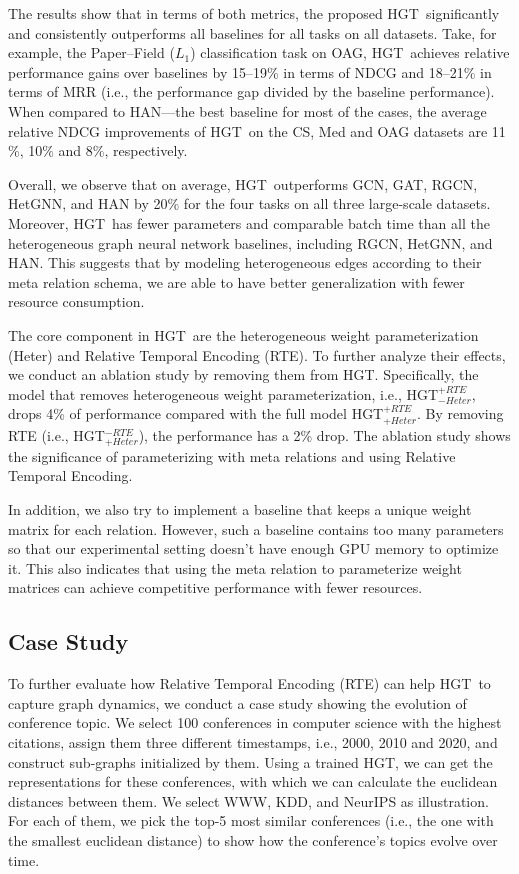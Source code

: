 \documentclass[sigconf]{acmart}
\theoremstyle{definition}
\newcommand{\short}{HGT}
\begin{document}
The results show that in terms of both metrics, the proposed \short\ significantly and consistently outperforms all baselines for all tasks on all datasets. 
Take, for example, the Paper--Field ($L_1$) classification task on OAG, \short\ achieves relative performance gains over baselines by 15--19\% in terms of NDCG and 18--21\% in terms of MRR (i.e., the performance gap divided by the baseline performance). 
When compared to HAN---the best baseline for most of the cases, the average relative NDCG improvements of \short\ on the CS, Med and OAG datasets are 11$\%$, 10$\%$ and 8$\%$, respectively. 

Overall, we observe that on average, \short\ outperforms GCN, GAT, RGCN, HetGNN, and HAN by 20\% for the four tasks on all three large-scale datasets.  
Moreover, \short\ has fewer parameters and comparable batch time than all the heterogeneous graph neural network baselines, including RGCN, HetGNN, and HAN. 
This suggests that by modeling heterogeneous edges according to their meta relation schema, we are able to have better generalization with fewer resource consumption. 



The core component in \short\ are the heterogeneous weight parameterization (Heter) and Relative Temporal Encoding (RTE).
To further analyze their effects, we conduct an ablation study by removing them from \short. 
Specifically, the model that removes heterogeneous weight parameterization, i.e., \short$_{-Heter}^{+RTE}$, drops 4\% of performance compared with the full model \short$_{+Heter}^{+RTE}$. 
By removing RTE (i.e., \short$_{+Heter}^{-RTE}$), the performance has a 2\% drop. 
The ablation study shows the significance of parameterizing with meta relations and using Relative Temporal Encoding.



In addition, we also try to implement a baseline that keeps a unique weight matrix for each relation. However, such a baseline contains too many parameters so that our experimental setting doesn't have enough GPU memory to optimize it. This also indicates that using the meta relation to parameterize weight matrices can achieve competitive performance with fewer resources.


\subsection{Case Study}

To further evaluate how  Relative Temporal Encoding (RTE) can help \short\ to capture graph dynamics, we conduct a case study showing the evolution of conference topic. 
We select 100 conferences in computer science with the highest citations, assign them three different timestamps, i.e., 2000, 2010 and 2020, and construct sub-graphs initialized by them. 
Using a trained HGT, we can get the representations for these conferences, with which we can calculate the euclidean distances between them. 
We select WWW, KDD, and NeurIPS as illustration. 
For each of them, we pick the top-5 most similar conferences (i.e., the one with the smallest euclidean distance) to show how the conference's topics evolve over time. 
\end{document}
